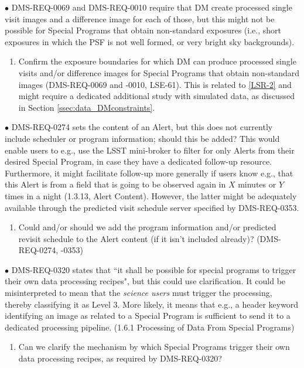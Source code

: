 \documentclass[DM,lsstdraft,toc]{lsstdoc}
\begin{document}
$\bullet$ DMS-REQ-0069 and DMS-REQ-0010 require that DM create processed single visit images and a difference image for each of those, but this might not be possible for Special Programs that obtain non-standard exposures (i.e., short exposures in which the PSF is not well formed, or very bright sky backgrounds). 
\begin{enumerate}[topsep=-10pt,after=\vspace{10pt},label= \textbf{Concern \Roman*.},resume] \item \label{DMSR-3} Confirm the exposure boundaries for which DM can produce processed single visits and/or difference images for Special Programs that obtain non-standard images (DMS-REQ-0069 and -0010, LSE-61). This is related to \ref{LSR-2} and might require a dedicated additional study with simulated data, as discussed in Section \ref{ssec:data_DMconstraints}. \end{enumerate}

$\bullet$ DMS-REQ-0274 sets the content of an Alert, but this does not currently include scheduler or program information; should this be added? This would enable users to e.g., use the LSST mini-broker to filter for only Alerts from their desired Special Program, in case they have a dedicated follow-up resource. Furthermore, it might facilitate follow-up more generally if users know e.g., that this Alert is from a field that is going to be observed again in $X$ minutes or $Y$ times in a night (1.3.13, Alert Content). However, the latter might be adequately available through the predicted visit schedule server specified by DMS-REQ-0353.
\begin{enumerate}[topsep=-10pt,after=\vspace{10pt},label= \textbf{Concern \Roman*.},resume] \item \label{DMSR-4} Could and/or should we add the program information and/or predicted revisit schedule to the Alert content (if it isn't included already)? (DMS-REQ-0274, -0353) \end{enumerate}

$\bullet$ DMS-REQ-0320 states that ``it shall be possible for special programs to trigger their own data processing recipes", but this could use clarification. It could be misinterpreted to mean that the {\it science users} must trigger the processing, thereby classifying it as Level 3. More likely, it means that e.g., a header keyword identifying an image as related to a Special Program is sufficient to send it to a dedicated processing pipeline. (1.6.1 Processing of Data From Special Programs)
\begin{enumerate}[topsep=-10pt,after=\vspace{10pt},label= \textbf{Concern \Roman*.},resume] \item \label{DMSR-5} Can we clarify the mechanism by which Special Programs trigger their own data processing recipes, as required by DMS-REQ-0320? \end{enumerate}
\end{document}
